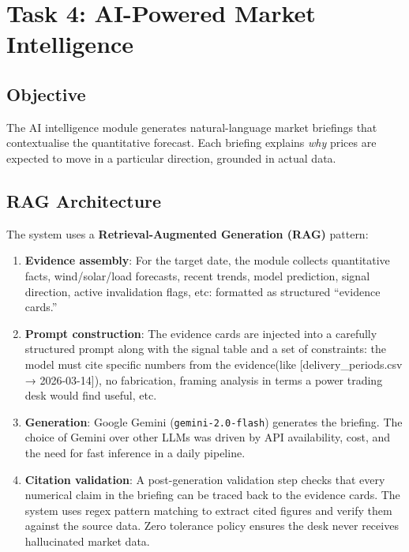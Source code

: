 \documentclass[11pt,a4paper]{article}
\begin{document}
\section{Task 4: AI-Powered Market Intelligence}
\label{sec:task4}

\subsection{Objective}

The AI intelligence module generates natural-language market briefings that contextualise the quantitative forecast. Each briefing explains \emph{why} prices are expected to move in a particular direction, grounded in actual data.

\subsection{RAG Architecture}

The system uses a \textbf{Retrieval-Augmented Generation (RAG)} pattern:

\begin{enumerate}
  \item \textbf{Evidence assembly}: For the target date, the module collects quantitative facts, wind/solar/load forecasts, recent  trends, model prediction, signal direction, active invalidation flags, etc: formatted as structured ``evidence cards.''

  \item \textbf{Prompt construction}: The evidence cards are injected into a carefully structured prompt along with the signal table and a set of constraints: the model must cite specific numbers from the evidence(like [delivery\_periods.csv → 2026-03-14]), no fabrication, framing analysis in terms a power trading desk would find useful, etc.

  \item \textbf{Generation}: Google Gemini (\texttt{gemini-2.0-flash}) generates the briefing. The choice of Gemini over other LLMs was driven by API availability, cost, and the need for fast inference in a daily pipeline.

  \item \textbf{Citation validation}: A post-generation validation step checks that every numerical claim in the briefing can be traced back to the evidence cards. The system uses regex pattern matching to extract cited figures and verify them against the source data. Zero tolerance policy ensures the desk never receives hallucinated market data.
\end{enumerate}
\end{document}
